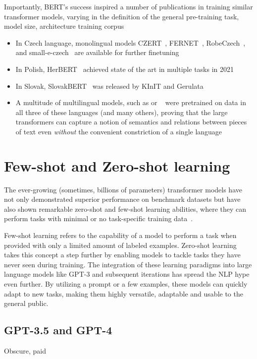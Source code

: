 Importantly, BERT's success inspired a number of publications in training similar transformer models, varying in the definition of the general pre-training task, model size, architecture training corpus

\begin{itemize}
    \item In Czech language, monolingual models CZERT~\cite{czert}, FERNET~\cite{fernet}, RobeCzech~\cite{straka2021robeczech}, and small-e-czech~\cite{kocian2021siamese} are available for further finetuning
    \item In Polish, HerBERT~\cite{mroczkowski-etal-2021-herbert} achieved state of the art in multiple tasks in 2021
    \item In Slovak, SlovakBERT~\cite{pikuliak2021slovakbert} was released by KInIT and Gerulata
    \item A multitude of multilingual models, such as \MBERT or \XLM~\cite{xlm-roberta} were pretrained on data in all three of these languages (and many others), proving that the large transformers can capture a notion of semantics and relations between pieces of text even \textit{without} the convenient constriction of a single language 
\end{itemize}

\section{Few-shot and Zero-shot learning}
\label{sec:llms}
The ever-growing (sometimes, billions of parameters) transformer models have not only demonstrated superior performance on benchmark datasets but have also shown remarkable zero-shot and few-shot learning abilities, where they can perform tasks with minimal or no task-specific training data~\cite{gpt3}.

Few-shot learning refers to the capability of a model to perform a task when provided with only a limited amount of labeled examples. Zero-shot learning takes this concept a step further by enabling models to tackle tasks they have never seen during training. The integration of these learning paradigms into large language models like GPT-3 and subsequent iterations has spread the NLP hype even further. By utilizing a prompt or a few examples, these models can quickly adapt to new tasks, making them highly versatile, adaptable and usable to the general public.
\subsection{GPT-3.5 and GPT-4}
\label{sec:gpt}
Obscure, paid~\cite{gpt3,gpt4}

